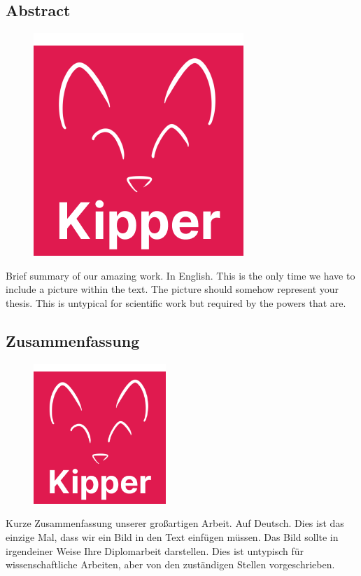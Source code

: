 \begin{spacing}{1}
    \chapter*{Abstract}
\end{spacing}
\begin{figure}
    \begin{center}
      \includegraphics[height=0.4\textwidth]{pics/Kipper-Logo.png}
    \end{center}
\end{figure}

Brief summary of our amazing work. In English.
This is the only time we have to include a picture within the text.
The picture should somehow represent your thesis.
This is untypical for scientific work but required by the powers that are.

\lipsum[1-2]

\begin{spacing}{1}
	\chapter*{Zusammenfassung}
\end{spacing}
\begin{figure}
	\begin{center}
		\includegraphics[height=200px]{pics/Kipper-Logo.png}
	\end{center}
\end{figure}

Kurze Zusammenfassung unserer großartigen Arbeit. Auf Deutsch.
Dies ist das einzige Mal, dass wir ein Bild in den Text einfügen müssen.
Das Bild sollte in irgendeiner Weise Ihre Diplomarbeit darstellen.
Dies ist untypisch für wissenschaftliche Arbeiten, aber von den zuständigen Stellen vorgeschrieben.

\lipsum[1-2]
